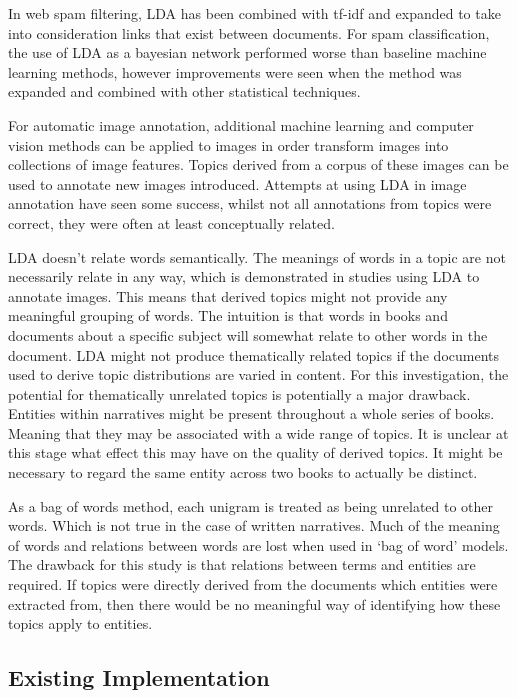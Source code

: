 \documentclass[10pt]{report}
\begin{document}
In web spam filtering, LDA has been combined with tf-idf and expanded to take into consideration links that exist between documents. For spam classification, the use of LDA as a bayesian network performed worse than baseline machine learning methods, however improvements were seen when the method was expanded and combined with other statistical techniques.~\cite{Biro2008-ld}

For automatic image annotation, additional machine learning and computer vision methods can be applied to images in order transform images into collections of image features. Topics derived from a corpus of these images can be used to annotate new images introduced. Attempts at using LDA in image annotation have seen some success, whilst not all annotations from topics were correct, they were often at least conceptually related.~\cite{Feng2010-dp, Zhang2011-dn}

LDA doesn’t relate words semantically. The meanings of words in a topic are not necessarily relate in any way, which is demonstrated in studies using LDA to annotate images. This means that derived topics might not provide any meaningful grouping of words. The intuition is that words in books and documents about a specific subject will somewhat relate to other words in the document. LDA might not produce thematically related topics if the documents used to derive topic distributions are varied in content. For this investigation, the potential for thematically unrelated topics is potentially a major drawback. Entities within narratives might be present throughout a whole series of books. Meaning that they may be associated with a wide range of topics. It is unclear at this stage what effect this may have on the quality of derived topics. It might be necessary to regard the same entity across two books to actually be distinct.

As a bag of words method, each unigram is treated as being unrelated to other words. Which is not true in the case of written narratives. Much of the meaning of words and relations between words are lost when used in ‘bag of word’ models. The drawback for this study is that relations between terms and entities are required. If topics were directly derived from the documents which entities were extracted from, then there would be no meaningful way of identifying how these topics apply to entities.

\subsection{Existing Implementation}
\end{document}
